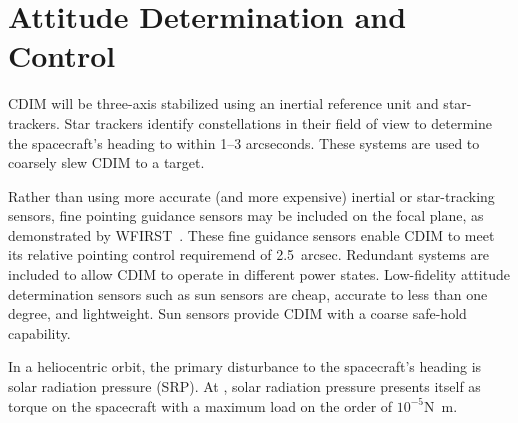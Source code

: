 \documentclass{ws-jai}
\begin{document}



\section{Attitude Determination and Control}
\label{sec:adcs}
CDIM will be three-axis stabilized using an inertial reference unit and star-trackers.
Star trackers identify constellations in their field of view to determine the spacecraft's heading to within 1--3 arcseconds.
These systems are used to coarsely slew CDIM to a target.

Rather than using more accurate (and more expensive) inertial or star-tracking sensors, fine pointing guidance sensors may be included on the focal plane, as demonstrated by WFIRST~\cite{wfirstFinal2012}.
These fine guidance sensors enable CDIM to meet its relative pointing control requiremend of \SI{2.5}{arcsec}.
Redundant systems are included to allow CDIM to operate in different power states.
Low-fidelity attitude determination sensors such as sun sensors are cheap, accurate to less than one degree, and lightweight.
Sun sensors provide CDIM with a coarse safe-hold capability.

In a heliocentric orbit, the primary disturbance to the spacecraft's heading is solar radiation pressure (SRP).
At \Ltwo, solar radiation pressure presents itself as torque on the spacecraft with a maximum load on the order of $10^{-5}$\si{\newton\meter}.
\end{document}
